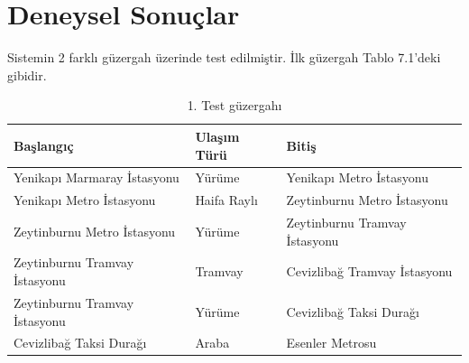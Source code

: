 \chapter{Deneysel Sonuçlar}
Sistemin 2 farklı güzergah üzerinde test edilmiştir. İlk güzergah Tablo 7.1'deki gibidir.

\begin{table}[!h]
\centering
\caption{1. Test güzergahı}
\label{my-label}
\begin{tabular}{|l|l|l|}
\hline
\textbf{Başlangıç}            & \textbf{Ulaşım Türü} & \textbf{Bitiş}                \\ \hline
Yenikapı Marmaray İstasyonu   & Yürüme               & Yenikapı Metro İstasyonu      \\ \hline
Yenikapı  Metro İstasyonu     & Haifa Raylı          & Zeytinburnu  Metro İstasyonu  \\ \hline
Zeytinburnu Metro İstasyonu   & Yürüme               & Zeytinburnu Tramvay İstasyonu \\ \hline
Zeytinburnu Tramvay İstasyonu & Tramvay              & Cevizlibağ Tramvay İstasyonu  \\ \hline
Zeytinburnu Tramvay İstasyonu & Yürüme               & Cevizlibağ Taksi Durağı       \\ \hline
Cevizlibağ Taksi Durağı       & Araba                & Esenler Metrosu               \\ \hline
\end{tabular}
\end{table}

